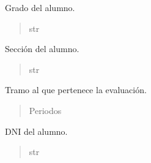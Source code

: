 \documentclass[letterpaper,10pt,spanish]{sphinxmanual}
\begin{document}
\begin{fulllineitems}
\begin{fulllineitems}
\end{fulllineitems}



\begin{fulllineitems}

\pysigstartsignatures
{}
\pysigstopsignatures
\sphinxAtStartPar
Grado del alumno.
\begin{quote}\begin{description}
\sphinxAtStartPar
str

\end{description}\end{quote}

\end{fulllineitems}



\begin{fulllineitems}

\pysigstartsignatures
{}
\pysigstopsignatures
\sphinxAtStartPar
Sección del alumno.
\begin{quote}\begin{description}
\sphinxAtStartPar
str

\end{description}\end{quote}

\end{fulllineitems}



\begin{fulllineitems}

\pysigstartsignatures
{}
\pysigstopsignatures
\sphinxAtStartPar
Tramo al que pertenece la evaluación.
\begin{quote}\begin{description}
\sphinxAtStartPar
Periodos

\end{description}\end{quote}

\end{fulllineitems}



\begin{fulllineitems}

\pysigstartsignatures
{}
\pysigstopsignatures
\sphinxAtStartPar
DNI del alumno.
\begin{quote}\begin{description}
\sphinxAtStartPar
str


\end{description}
\end{quote}
\end{fulllineitems}
\end{fulllineitems}
\end{document}

